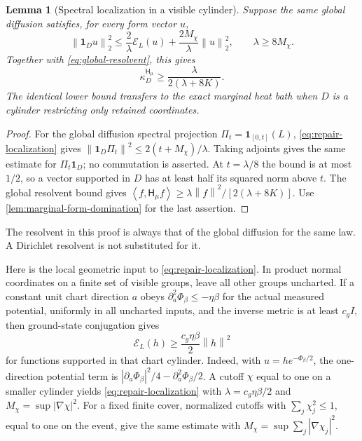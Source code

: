 \documentclass[11pt,oneside,openany]{book}
\newtheorem{lemma}[lemma]{Lemma}
\theoremstyle{definition}
\theoremstyle{remark}
\newcommand{\one}{\mathbf1}
\newcommand{\norm}[1]{\left\lVert#1\right\rVert}
\newcommand{\ip}[2]{\left\langle#1,#2\right\rangle}
\begin{document}
\begin{lemma}[Spectral localization in a visible cylinder]
\label{lem:repair-localization}
Suppose the same global diffusion satisfies, for every form vector $u$,
\begin{equation}\label{eq:repair-localization}
 \norm{\one_Du}_2^2\le\frac2\lambda\mathcal E_L(u)
                           +\frac{2M_\chi}{\lambda}\norm u_2^2,
 \qquad \lambda\ge8M_\chi.
\end{equation}
Together with \cref{eq:global-resolvent}, this gives
\begin{equation}\label{eq:repair-floor-general}
 \kappa_D^{\mathsf H_\mu}\ge
                 \frac{\lambda}{2(\lambda+8K)}.
\end{equation}
The identical lower bound transfers to the exact marginal heat bath
when $D$ is a cylinder restricting only retained coordinates.
\end{lemma}
\begin{proof}
For the global diffusion spectral projection
$\Pi_t=\one_{[0,t]}(L)$, \cref{eq:repair-localization} gives
$\norm{\one_D\Pi_t}^2\le2(t+M_\chi)/\lambda$.
Taking adjoints gives the same estimate for $\Pi_t\one_D$; no
commutation is asserted. At $t=\lambda/8$ the bound is at most $1/2$,
so a vector supported in $D$ has at least half its squared norm above
$t$. The global resolvent bound gives
$\ip f{\mathsf H_\mu f}\ge\lambda\norm f^2/[2(\lambda+8K)]$.
Use \cref{lem:marginal-form-domination} for the last assertion.
\end{proof}
The resolvent in this proof is always that of the global diffusion for
the same law. A Dirichlet resolvent is not substituted for it.

Here is the local geometric input to \cref{eq:repair-localization}.
In product normal coordinates on a finite set of visible groups,
leave all other groups uncharted. If a constant unit chart direction
$a$ obeys
$\partial_a^2\Phi_\beta\le-\eta\beta$ for the actual measured
potential, uniformly in all uncharted inputs, and the inverse metric
is at least $c_gI$, then ground-state conjugation gives
\[
 \mathcal E_L(h)\ge\frac{c_g\eta\beta}{2}\norm h^2
\]
for functions supported in that chart cylinder. Indeed, with
$u=h e^{-\Phi_\beta/2}$, the one-direction potential term is
$|\partial_a\Phi_\beta|^2/4-\partial_a^2\Phi_\beta/2$.
A cutoff $\chi$ equal to one on a smaller cylinder yields
\cref{eq:repair-localization} with
$\lambda=c_g\eta\beta/2$ and $M_\chi=\sup|\nabla\chi|^2$.
For a fixed finite cover, normalized cutoffs with
$\sum_j\chi_j^2\le1$, equal to one on the event, give the same estimate
with $M_\chi=\sup\sum_j|\nabla\chi_j|^2$.
\end{document}
